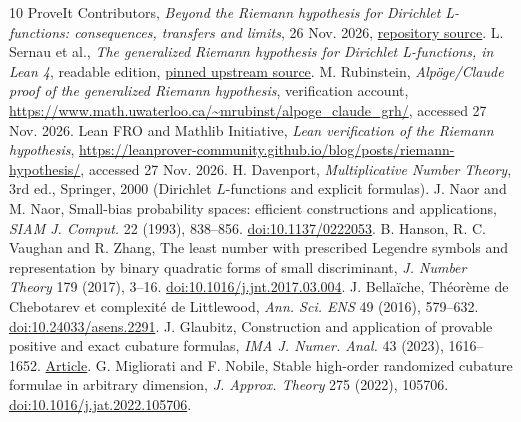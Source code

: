 \documentclass[11pt]{article}
\theoremstyle{remark}\newtheorem{remark}[theorem]{Remark}
\begin{document}
\begin{thebibliography}{10}\small
{} ProveIt Contributors, \emph{Beyond the Riemann hypothesis for Dirichlet L-functions: consequences, transfers and limits}, 26 Nov. 2026, \href{https://github.com/VladimirReshetnikov/ProveIt/tree/main/Analysis/GeneralizedRiemannHypothesis/Article}{repository source}.
 L. Sernau et al., \emph{The generalized Riemann hypothesis for Dirichlet L-functions, in Lean 4}, readable edition, \href{https://github.com/lsernau/grh-lean/tree/72fead102f663d5c7a407964a13dc0cf9d977207/grh}{pinned upstream source}.
 M. Rubinstein, \emph{Alp\"oge/Claude proof of the generalized Riemann hypothesis}, verification account, \url{https://www.math.uwaterloo.ca/~mrubinst/alpoge_claude_grh/}, accessed 27 Nov. 2026.
 Lean FRO and Mathlib Initiative, \emph{Lean verification of the Riemann hypothesis}, \url{https://leanprover-community.github.io/blog/posts/riemann-hypothesis/}, accessed 27 Nov. 2026.
 H. Davenport, \emph{Multiplicative Number Theory}, 3rd ed., Springer, 2000 (Dirichlet $L$-functions and explicit formulas).
 J. Naor and M. Naor, Small-bias probability spaces: efficient constructions and applications, \emph{SIAM J. Comput.} 22 (1993), 838--856. \href{https://doi.org/10.1137/0222053}{doi:10.1137/0222053}.
 B. Hanson, R. C. Vaughan and R. Zhang, The least number with prescribed Legendre symbols and representation by binary quadratic forms of small discriminant, \emph{J. Number Theory} 179 (2017), 3--16. \href{https://doi.org/10.1016/j.jnt.2017.03.004}{doi:10.1016/j.jnt.2017.03.004}.
 J. Bella\"iche, Th\'eor\`eme de Chebotarev et complexit\'e de Littlewood, \emph{Ann. Sci. ENS} 49 (2016), 579--632. \href{https://doi.org/10.24033/asens.2291}{doi:10.24033/asens.2291}.
 J. Glaubitz, Construction and application of provable positive and exact cubature formulas, \emph{IMA J. Numer. Anal.} 43 (2023), 1616--1652. \href{https://academic.oup.com/imajna/article/43/3/1616/6586010}{Article}.
 G. Migliorati and F. Nobile, Stable high-order randomized cubature formulae in arbitrary dimension, \emph{J. Approx. Theory} 275 (2022), 105706. \href{https://doi.org/10.1016/j.jat.2022.105706}{doi:10.1016/j.jat.2022.105706}.
\end{thebibliography}
\end{document}
